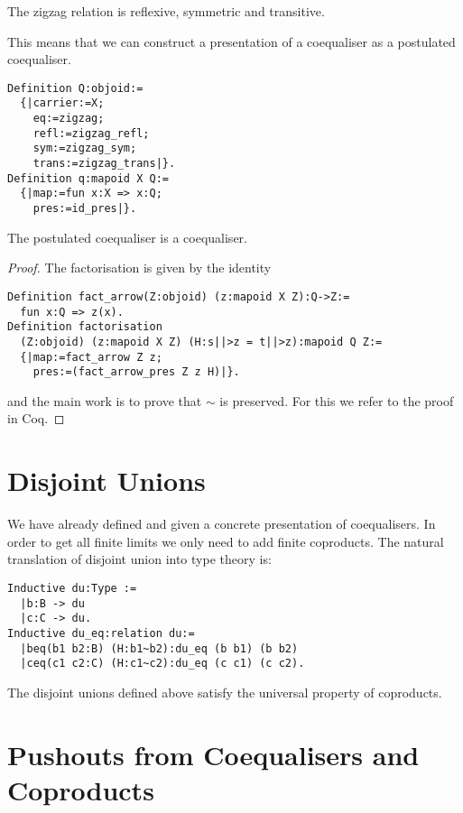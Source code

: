 \documentclass{article}
\begin{document}
\begin{lemma}
  The zigzag relation is reflexive, symmetric and transitive.
\end{lemma}

This means that we can construct a presentation of a coequaliser as a postulated coequaliser.

\begin{verbatim}
Definition Q:objoid:=
  {|carrier:=X;
    eq:=zigzag;
    refl:=zigzag_refl;
    sym:=zigzag_sym;
    trans:=zigzag_trans|}.
Definition q:mapoid X Q:=
  {|map:=fun x:X => x:Q;
    pres:=id_pres|}.
\end{verbatim}

\begin{proposition}
  The postulated coequaliser is a coequaliser.
  \begin{proof}
    The factorisation is given by the identity 
    \begin{verbatim}
Definition fact_arrow(Z:objoid) (z:mapoid X Z):Q->Z:=
  fun x:Q => z(x).    
Definition factorisation
  (Z:objoid) (z:mapoid X Z) (H:s||>z = t||>z):mapoid Q Z:=
  {|map:=fact_arrow Z z;
    pres:=(fact_arrow_pres Z z H)|}.
\end{verbatim}
    and the main work is to prove that $\sim$ is preserved.
    For this we refer to the proof in Coq.
  \end{proof}
\end{proposition}

\section{Disjoint Unions}
\label{sec:disjoint-unions}

We have already defined and given a concrete presentation of coequalisers.
In order to get all finite limits we only need to add finite coproducts.
The natural translation of disjoint union into type theory is:
\begin{verbatim}
Inductive du:Type :=
  |b:B -> du
  |c:C -> du.
Inductive du_eq:relation du:=
  |beq(b1 b2:B) (H:b1~b2):du_eq (b b1) (b b2)
  |ceq(c1 c2:C) (H:c1~c2):du_eq (c c1) (c c2).
\end{verbatim}

\begin{proposition}
  The disjoint unions defined above satisfy the universal property of coproducts.
\end{proposition}

\section{Pushouts from Coequalisers and Coproducts}
\label{sec:pushouts-from-coeq-and-coprod}
\end{document}
